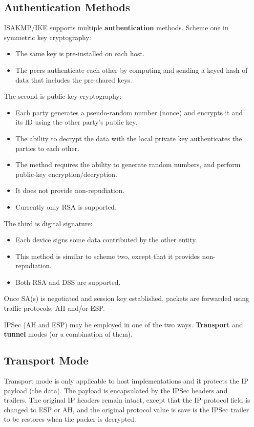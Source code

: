 \documentclass{article}
\begin{document}
\subsection{Authentication Methods}
ISAKMP/IKE supports multiple \textbf{authentication} methods. Scheme one in symmetric key cryptography:
\begin{itemize}
  \item The same key is pre-installed on each host.
  \item The peers authenticate each other by computing and sending a keyed hash of data that includes the pre-shared keys.
\end{itemize}
The second is public key cryptography:
\begin{itemize}
  \item Each party generates a pseudo-random number (nonce) and encrypts it and its ID using the other party's public key.
  \item The ability to decrypt the data with the local private key authenticates the parties to each other.
  \item The method requires the ability to generate random numbers, and perform public-key encryption/decryption.
  \item It does not provide non-repudiation.
  \item Currently only RSA is supported.
\end{itemize}
The third is digital signature:
\begin{itemize}
  \item Each device signs some data contributed by the other entity.
  \item This method is similar to scheme two, except that it provides non-repudiation.
  \item Both RSA and DSS are supported.
\end{itemize}
Once SA(s) is negotiated and session key established, packets are forwarded using traffic protocols, AH and/or ESP.

IPSec (AH and ESP) may be employed in one of the two ways. \textbf{Transport} and \textbf{tunnel} modes (or a combination of them).

\subsection{Transport Mode}
Transport mode is only applicable to host implementations and it protects the IP payload (the data). The payload is encapsulated by the IPSec headers and trailers. The original IP headers remain intact, except that the IP protocol field is changed to ESP or AH, and the original protocol value is save is the IPSec trailer to be restores when the packer is decrypted.
\end{document}
